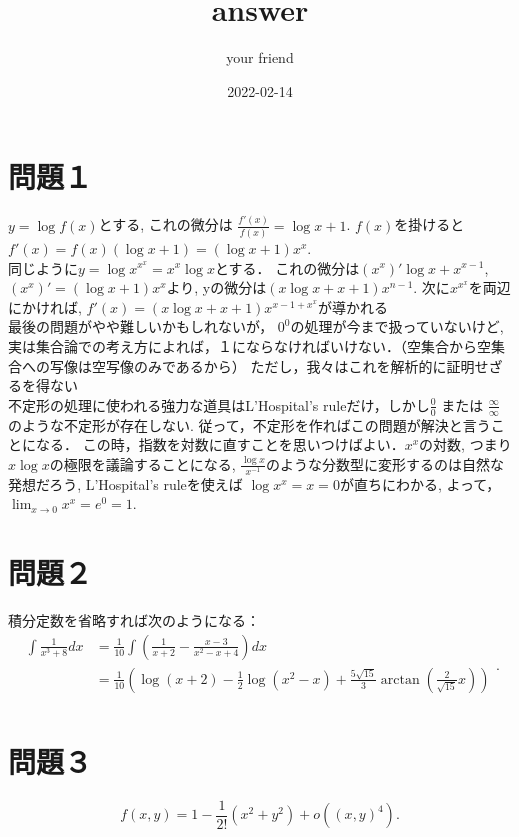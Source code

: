 \documentclass[dvipdfmx]{jreport}
\begin{document}
\title{answer}
\author{your friend}
\date{2022-02-14}
\maketitle
\newpage
\tableofcontents
{}
\newpage
\section{問題１}%
\label{sec:問題１}
 $y=\log f(x)$とする, これの微分は $\frac{f'(x)}{f(x)}= \log x + 1$. $f(x)$を掛けると $f'(x)= f(x) \left(\log x +1 \right) = \left(\log x + 1\right) x^x$.\\
	同じように$y= \log x^{x^x}= x^x \log x $とする． 
	これの微分は$ (x^x)' \log x + x^{x-1}$, $(x^x)'= \left(\log x +1 \right)x^x$より, 
	yの微分は$(x\log x + x + 1) x^{n-1}$. 次に$x^{x^{x}}$を両辺にかければ,
	$f'(x) = (x \log x + x +1 ) x^{x-1 + x^x}$が導かれる \\
	最後の問題がやや難しいかもしれないが， $0^0$の処理が今まで扱っていないけど, 
	実は集合論での考え方によれば，１にならなければいけない．（空集合から空集合への写像は空写像のみであるから）
	ただし，我々はこれを解析的に証明せざるを得ない\\
	不定形の処理に使われる強力な道具はL'Hospital's ruleだけ，しかし$\frac{0}{0}$ または $\frac{\infty}{\infty}$のような不定形が存在しない.
	従って，不定形を作ればこの問題が解決と言うことになる．
	この時，指数を対数に直すことを思いつけばよい．$x^x$の対数, つまり$x \log x$の極限を議論することになる,
 $\frac{\log x }{ x^{-1}}$のような分数型に変形するのは自然な発想だろう,
	L'Hospital's ruleを使えば $\log x^x =  x =0$が直ちにわかる,
	よって，$\lim_{x \to 0} x^x = e^0 =1 $.
\section{問題２}%
\label{sec:問題２}
積分定数を省略すれば次のようになる：
$$
\begin{aligned}
	\int \frac{1}{x^3+8} dx &= \frac{1}{10} \int \left(\frac{1}{x+2}-\frac{x-3}{x^2-x+4}\right) dx \\
	&= \frac{1}{10} \left(\log (x+2)  -\frac{1}{2} \log (x^2 -x) + \frac{5\sqrt{15}}{3} \arctan (\frac{2}{\sqrt{15}}x) \right) \\ 
\end{aligned}
.$$ 
\section{問題３}%
\label{sec:問題３}
\[
	f(x,y)=1-\frac{1}{2!} \left( x^2 + y^2 \right) +o( (x,y)^{4} )
.\] 
\end{document}
